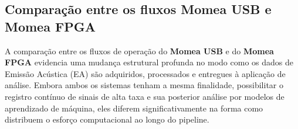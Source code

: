 %


\subsection{Comparação entre os fluxos Momea USB e Momea FPGA}

A comparação entre os fluxos de operação do \textbf{Momea USB} e do \textbf{Momea FPGA} evidencia uma mudança estrutural profunda no modo como os dados de Emissão Acústica (EA) são adquiridos, processados e entregues à aplicação de análise. Embora ambos os sistemas tenham a mesma finalidade, possibilitar o registro contínuo de sinais de alta taxa e sua posterior análise por modelos de aprendizado de máquina, eles diferem significativamente na forma como distribuem o esforço computacional ao longo do pipeline.


